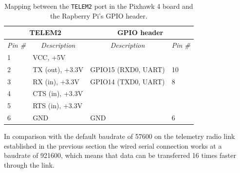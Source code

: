 \begin{table}[]
\centering
\begin{tabular}{|ll||ll|}
\hline
\multicolumn{2}{|c||}{\textbf{TELEM2}}                                             & \multicolumn{2}{c|}{\textbf{GPIO header}}                                        \\ \hline \hline
\multicolumn{1}{|c|}{\textit{Pin \#}} & \multicolumn{1}{c||}{\textit{Description}} & \multicolumn{1}{c|}{\textit{Description}} & \multicolumn{1}{c|}{\textit{Pin \#}} \\ \hline
\multicolumn{1}{|l|}{1}               & VCC, +5V                                  & \multicolumn{1}{l|}{}                     &                                      \\ \hline
\multicolumn{1}{|l|}{2}               & TX (out), +3.3V                           & \multicolumn{1}{l|}{GPIO15 (RXD0, UART)}  & 10                                   \\ \hline
\multicolumn{1}{|l|}{3}               & RX (in), +3.3V                            & \multicolumn{1}{l|}{GPIO14 (TXD0, UART)}  & 8                                    \\ \hline
\multicolumn{1}{|l|}{4}               & CTS (in), +3.3V                           & \multicolumn{1}{l|}{}                     &                                      \\ \hline
\multicolumn{1}{|l|}{5}               & RTS (in), +3.3V                           & \multicolumn{1}{l|}{}                     &                                      \\ \hline
\multicolumn{1}{|l|}{6}               & GND                                       & \multicolumn{1}{l|}{GND}                  & 6                                    \\ \hline
\end{tabular}
\caption{Mapping between the \texttt{TELEM2} port in the Pixhawk 4 board and the Rapberry Pi's GPIO header.}
\label{tab:wiring-telem}
\end{table}

In comparison with the default baudrate of 57600 on the telemetry radio link established in the previous section the wired serial connection works at a baudrate of 921600, which means that data can be transferred 16 times faster through the link.


